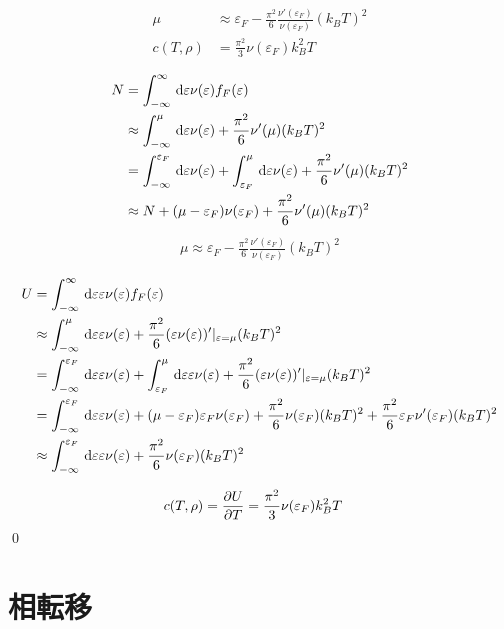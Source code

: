 \documentclass[uplatex,diffipdfmx,a4paper,11pt]{jlreq}
\makeatletter
\theoremstyle{definition}
\renewenvironment{proof}[1][\proofname]{\par
  \normalfont
  \topsep6\p@\@plus6\p@ \trivlist
  \item[\hskip\labelsep{\bfseries #1}\@addpunct{\bfseries}]\ignorespaces\quad\par
}{%
  \qed\endtrivlist\@endpefalse
}
\renewcommand\proofname{証明}
\makeatother
\begin{document}
\begin{theorem}
  \begin{align}
    \mu & \approx \varepsilon_F - \frac{\pi^2}{6}\frac{\nu'(\varepsilon_F)}{\nu(\varepsilon_F)}(k_BT)^2                                          \\
    c(T, \rho) & = \frac{\pi^2}{3}\nu(\varepsilon_F)k_B^2T
  \end{align}
\end{theorem}
\begin{proof}
  \begin{align}
    N & = \int_{-\infty}^{\infty}\dl{\varepsilon}\nu(\varepsilon)f_F(\varepsilon)                                                                                        \\
      & \approx \int_{-\infty}^{\mu}\dl{\varepsilon}\nu(\varepsilon) + \frac{\pi^2}{6}\nu'(\mu)(k_BT)^2                                                                  \\
      & = \int_{-\infty}^{\varepsilon_F}\dl{\varepsilon}\nu(\varepsilon) + \int_{\varepsilon_F}^{\mu}\dl{\varepsilon}\nu(\varepsilon) + \frac{\pi^2}{6}\nu'(\mu)(k_BT)^2 \\
      & \approx N + (\mu - \varepsilon_F)\nu(\varepsilon_F) + \frac{\pi^2}{6}\nu'(\mu)(k_BT)^2
  \end{align}
  \begin{align}
    \mu \approx \varepsilon_F - \frac{\pi^2}{6}\frac{\nu'(\varepsilon_F)}{\nu(\varepsilon_F)}(k_BT)^2
  \end{align}


  \begin{align}
    U & = \int_{-\infty}^{\infty}\dl{\varepsilon}\varepsilon\nu(\varepsilon)f_F(\varepsilon)                                                                                                                                                     \\
      & \approx \int_{-\infty}^\mu\dl{\varepsilon}\varepsilon\nu(\varepsilon) + \frac{\pi^2}{6}(\varepsilon\nu(\varepsilon))'|_{\varepsilon = \mu}(k_BT)^2                                                                                       \\
      & = \int_{-\infty}^{\varepsilon_F}\dl{\varepsilon}\varepsilon\nu(\varepsilon) + \int_{\varepsilon_F}^\mu\dl{\varepsilon}\varepsilon\nu(\varepsilon) + \frac{\pi^2}{6}(\varepsilon\nu(\varepsilon))'|_{\varepsilon = \mu}(k_BT)^2           \\
      & = \int_{-\infty}^{\varepsilon_F}\dl{\varepsilon}\varepsilon\nu(\varepsilon) + (\mu - \varepsilon_F)\varepsilon_F\nu(\varepsilon_F) + \frac{\pi^2}{6}\nu(\varepsilon_F)(k_BT)^2 + \frac{\pi^2}{6}\varepsilon_F\nu'(\varepsilon_F)(k_BT)^2 \\
      & \approx \int_{-\infty}^{\varepsilon_F}\dl{\varepsilon}\varepsilon\nu(\varepsilon) + \frac{\pi^2}{6}\nu(\varepsilon_F)(k_BT)^2
  \end{align}

  \begin{align}
    c(T, \rho) & = \diffp{U}{T} = \frac{\pi^2}{3}\nu(\varepsilon_F)k_B^2T
  \end{align}
\end{proof}

\section{相転移}
\end{document}

